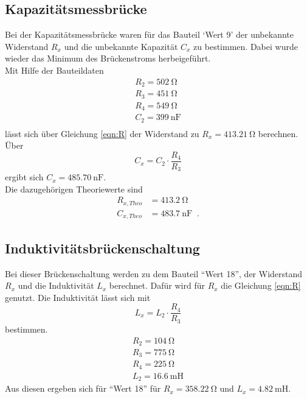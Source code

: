     \subsection{Kapazitätsmessbrücke}
        Bei der Kapazitätsmessbrücke waren für das Bauteil \enquote*{Wert 9} der unbekannte Widerstand $R_x$
        und die unbekannte Kapazität $C_x$ zu bestimmen. Dabei wurde wieder das Minimum des Brückenstroms herbeigeführt.\\
        Mit Hilfe der Bauteildaten
        \begin{align*}
          R_2 = \SI{502}{\ohm}\\
          R_3 = \SI{451}{\ohm}\\
          R_4 = \SI{549}{\ohm}\\
          C_2 = \SI{399}{\nano\farad}\\
        \end{align*}
        lässt sich über Gleichung \ref{eqn:R} der Widerstand zu $R_x=\SI{413.21}{\ohm}$ berechnen.\\
        Über
        \begin{equation}
            C_x=C_2 \cdot \frac{R_4}{R_3}
            \label{eqn:C}
        \end{equation}
        ergibt sich $C_x=\SI{485.70}{\nano\farad}$.\\
        Die dazugehörigen Theoriewerte sind 
        \begin{align*}
          R_{x, Theo} &= \SI{413.2}{\ohm}\\
          C_{x, Theo} &= \SI{483.7}{\nano\farad}\; \; \text{.}
        \end{align*}


    \subsection{Induktivitätsbrückenschaltung}
        Bei dieser Brückenschaltung werden zu dem Bauteil \enquote{Wert 18}, der Widerstand $R_x$ und die Induktivität $L_x$ berechnet.
        Dafür wird für $R_x$ die Gleichung \ref{eqn:R} genutzt. Die Induktivität lässt sich mit
        \begin{equation}
            L_x=L_2 \cdot \frac{R_4}{R_3}
            \label{eqn:L}
        \end{equation}
        bestimmen.
        \begin{align*}
          R_2 = \SI{104}{\ohm}\\
          R_3 = \SI{775}{\ohm}\\
          R_4 = \SI{225}{\ohm}\\
          L_2 = \SI{16.6}{\milli\henry}
        \end{align*}
        Aus diesen ergeben sich für \enquote{Wert 18} für $R_x = \SI{358.22}{\ohm}$ und $L_x =\SI{4.82}{\milli\henry} $.

